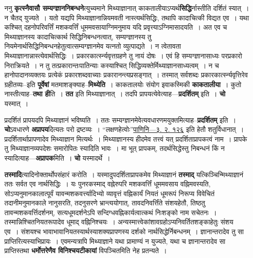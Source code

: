 \documentclass[article,12pt,a4paper]{memoir}
\begin{document}
	  \pstart ननु \textbf{कृत्स्नैवासौ सम्यग्ज्ञाननिबन्धने}त्युच्यमाने मिथ्याज्ञानात् काकतालीयाऽप्यर्थ\textbf{सिद्धि}र्नास्तीति दर्शितं स्यात् । न चैतद् युज्यते । यतो यद्यपि मिथ्याज्ञानान्नियमवती नास्त्यर्थसिद्धिः, तथापि कादाचित्की विद्यत एव । यथा कश्चित् दहनोपरिवर्त्तिं मशकवर्त्तिं धूममवसायाग्निमनुमाय यदि प्रवृत्त्याऽग्निमासादयति । अत एव च मिथ्याज्ञानस्य कादाचित्कार्थ \leavevmode{} सिद्धिनिबन्धनत्वात्, सम्यग्ज्ञानस्य तु नियमेनार्थसिद्धिनिबन्धनहेतुत्वात्सम्यग्ज्ञानमेव यत्नतो व्युत्पाद्यते । न त्वेतावता मिथ्याज्ञानान्नास्त्येवार्थसिद्धिः । प्रकारकार्त्स्न्यवृत्तग्रहणे तु नायं दोषः । एवं हि सम्यग्ज्ञानासाध्यः परप्रकारो निराक्रियते । न तु तत्प्रकारान्तःपातिन्याः कस्याश्चित् सिद्धिव्यक्तेर्मिथ्याज्ञानसाध्यत्वम् । न च हानोपादानव्यक्तयः प्रत्येकं प्रकारशब्दवाच्याः प्रकारानन्त्यप्रसङ्गात् । तस्मात् सर्वशब्दः प्रकारकार्त्स्न्यवृत्तिरेव ग्रहीतव्यः--इति \textbf{पूर्वेषां} मतमाशङ्क्याह--\textbf{मिथ्येति} । काकतालयोः संयोग इवाकस्मिकी \textbf{काकतालीया} । कुतो नास्तीत्याह--\textbf{तथा ही}ति । \textbf{तत} इति मिथ्याज्ञानात् । तदपि प्रापयत्येवेत्याह—\textbf{प्रदर्शितम्} इति । \textbf{चो} यस्मात् ।
	\pend
      

	  \pstart प्रदर्शितं प्रापयदपि मिथ्याज्ञानं भविष्यति । ततः सम्यग्ज्ञानमेवेत्यवधारणमयुक्तमित्याह--\textbf{प्रदर्शितम्} इति । \textbf{चो}ऽवधारणे \textbf{अप्रापय}दित्यतः परो द्रष्टव्यः । “लक्षणहेत्वोः”\href{http://http://sarit.indology.info/?cref=Pā.3.2.126}{पाणिनि—३. २. १२६} इति हेतौ शतुर्विधानात् । प्रदर्शितार्थाप्रापणादेव मिथ्याज्ञान \leavevmode{} मित्यर्थः । मिथ्याज्ञानस्य हीदमेव तत्त्वं यत् प्रदर्शिताप्रापकत्वं नाम । प्रापके तु मिथ्याज्ञानव्यपदेशः समारोपितः स्यादिति भावः । मा भूत् प्रापकम्, तदर्थसिद्धेस्तु निबन्धनं किं न स्यादित्याह—\textbf{अप्रापक}मिति । \textbf{चो} यस्मादर्थे ।
	\pend
      

	  \pstart \textbf{तस्मादि}त्यादिनोक्तार्थोपसंहारं करोति । यस्मादुपदर्शिताप्रापकमेव मिथ्याज्ञानं \textbf{तस्माद्} यत्किञ्चिन्मिथ्याज्ञानं ततः सर्वत एव नार्थसिद्धिः । यः पुनरकस्माद् वह्नेरुपरि मशकवर्त्तिं धूममवसाय वह्निमवस्यति, सोऽप्यनुमानकालात्पूर्वं यावन्मशकवर्त्त्यादिभ्यो व्यावृत्तं वह्निकार्यं नियतं धूमरूपं निरूप्य विवेचितं तदानीमनुमानकाले नानुसरति, तदनुसरणे भ्रान्त्ययोगात्, तावदनिवर्त्तिंते संशयहेतौ, तिष्ठतु तावन्मशकवर्त्तिदर्शनम्, सत्यधूमदर्शनेऽपि सन्दिग्धवह्निकार्यत्वात्कथं निःशङ्को नाम सचेतनः । तस्मान्निश्चितनियतरूपादेव धूमाद् वह्निनिश्चयः । अन्यस्मात्त्वेकांशावग्रहोऽप्यनिवर्तितशङ्काहेतुः संशय एव । संशयश्च भावाभावानियतस्यार्थस्याशक्यप्रापणस्य दर्शको नार्थसिद्धेर्निबन्धनम् । ज्ञानान्तरादेव तु सा प्राप्तिरित्यस्याभिप्रायः । एवमन्यत्रापि मिथ्याज्ञाने यथा प्रामाण्यं न युज्यते, यथा च ज्ञानान्तरादेव सा प्राप्तिस्तथा \textbf{धर्मोत्तरेणैव विनिश्चयटीकायां} विपञ्चितमिति नेह प्रतन्यते ।
	\pend
      
\end{document}
